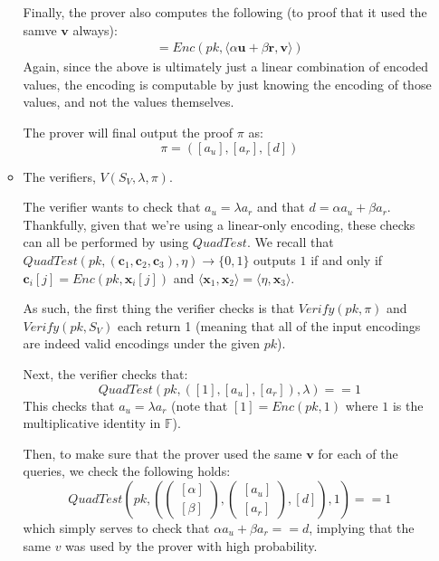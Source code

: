 \documentclass[12pt]{exam}
\begin{document}
\begin{questions}
\begin{solution}
\begin{enumerate}[label=\textbf{\alph*.}]
\begin{itemize}
      Finally, the prover also computes the following (to proof that it used the samve $\textbf{v}$ always):
      \begin{align*}
        [d] = \textit{Enc}(pk, \langle \alpha \textbf{u} + \beta \textbf{r}, \textbf{v} \rangle)
      \end{align*}
      Again, since the above is ultimately just a linear combination of encoded values, the encoding is computable by just knowing the encoding of those values, and not the values themselves.

      The prover will final output the proof $\pi$ as:
      \[
        \pi = ([a_u], [a_r], [d])
      \]
      \item The verifiers, $V(S_V, \lambda, \pi)$.

      The verifier wants to check that $a_u = \lambda a_r$ and that $d = \alpha a_u + \beta a_r$. Thankfully, given that we're using a linear-only encoding, these checks can all be performed by using $\textit{QuadTest}$. We recall that $\textit{QuadTest}(pk, (\textbf{c}_1, \textbf{c}_2, \textbf{c}_3), \eta) \rightarrow \{0,1 \}$ outputs $1$ if and only if $\textbf{c}_i[j] = \textit{Enc}(pk, \textbf{x}_i[j])$ and $\langle \textbf{x}_1, \textbf{x}_2 \rangle = \langle \eta,\textbf{x}_3 \rangle$.

      As such, the first thing the verifier checks is that $\textit{Verify}(pk, \pi)$ and $\textit{Verify}(pk, S_V)$ each return 1 (meaning that all of the input encodings are indeed valid encodings under the given $pk$).

      Next, the verifier checks that:
      \[
        \textit{QuadTest}(pk, ([1], [a_u], [a_r]), \lambda) == 1
      \]
      This checks that $a_u = \lambda a_r$ (note that $[1] = \textit{Enc}(pk, 1)$ where $1$ is the multiplicative identity in $\mathbb{F}$).

      Then, to make sure that the prover used the same $\textbf{v}$ for each of the queries, we check the following holds:
      \[
        \textit{QuadTest}\left(pk, \left( \begin{pmatrix} [\alpha] \\ [\beta] \end{pmatrix},  \begin{pmatrix} [a_u] \\ [a_r] \end{pmatrix} , [d]\right), 1 \right) == 1
      \]
      which simply serves to check that $\alpha a_u + \beta a_r == d$, implying that the same $v$ was used by the prover with high probability.


\end{itemize}
\end{enumerate}
\end{solution}
\end{questions}
\end{document}

